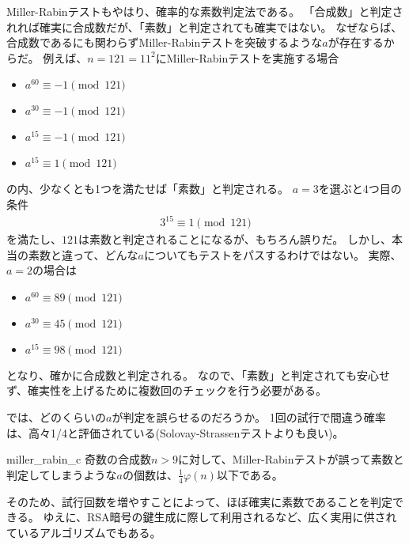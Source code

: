 Miller-Rabinテストもやはり、確率的な素数判定法である。
「合成数」と判定されれば確実に合成数だが、「素数」と判定されても確実ではない。
なぜならば、合成数であるにも関わらずMiller-Rabinテストを突破するような$a$が存在するからだ。
例えば、$n=121=11^2$にMiller-Rabinテストを実施する場合
\begin{itemize}
\item $a^{60} \equiv -1 \pmod{121}$
\item $a^{30} \equiv -1 \pmod{121}$
\item $a^{15} \equiv -1 \pmod{121}$
\item $a^{15} \equiv 1 \pmod{121}$
\end{itemize}
の内、少なくとも1つを満たせば「素数」と判定される。
$a=3$を選ぶと4つ目の条件
\begin{align*}
3^{15} \equiv 1 \pmod{121}
\end{align*}
を満たし、$121$は素数と判定されることになるが、もちろん誤りだ。
しかし、本当の素数と違って、どんな$a$についてもテストをパスするわけではない。
実際、$a=2$の場合は
\begin{itemize}
\item $a^{60} \equiv 89 \pmod{121}$
\item $a^{30} \equiv 45 \pmod{121}$
\item $a^{15} \equiv 98 \pmod{121}$
\end{itemize}
となり、確かに合成数と判定される。
なので、「素数」と判定されても安心せず、確実性を上げるために複数回のチェックを行う必要がある。



では、どのくらいの$a$が判定を誤らせるのだろうか。
1回の試行で間違う確率は、高々1/4と評価されている(Solovay-Strassenテストよりも良い)。

\begin{Prop}{}{miller_rabin_c}
奇数の合成数$n>9$に対して、Miller-Rabinテストが誤って素数と判定してしまうような$a$の個数は、$\frac{1}{4}\varphi(n)$以下である。
\end{Prop}

そのため、試行回数を増やすことによって、ほぼ確実に素数であることを判定できる。
ゆえに、RSA暗号の鍵生成に際して利用されるなど、広く実用に供されているアルゴリズムでもある。

